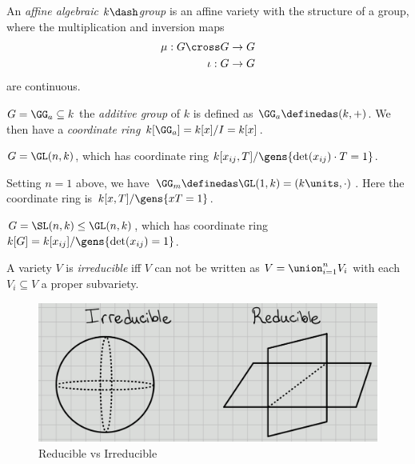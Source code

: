 \begin{definition}

An \emph{affine algebraic \(k\dash\)group} is an affine variety with the
structure of a group, where the multiplication and inversion maps
\begin{align*}  
\mu: G\cross G &\to G \\
\iota: G&\to G
\end{align*} are continuous.

\end{definition}

\begin{example}

\(G = \GG_a \subseteq k\) the \emph{additive group} of \(k\) is defined
as \(\GG_a \definedas (k, +)\). We then have a \emph{coordinate ring}
\(k[\GG_a] = k[x] / I = k[x]\).

\end{example}

\begin{example}

\(G = \GL(n, k)\), which has coordinate ring
\(k[x_{ij}, T] / \gens{\det(x_{ij})\cdot T = 1}\).

\end{example}

\begin{example}

Setting \(n=1\) above, we have
\(\GG_m \definedas \GL(1, k) = (k\units, \cdot)\). Here the coordinate
ring is \(k[x, T] / \gens{xT = 1}\).

\end{example}

\begin{example}

\(G = \SL(n, k) \leq \GL(n, k)\), which has coordinate ring
\(k[G] = k[x_{ij}] / \gens{\det(x_{ij}) = 1}\).

\end{example}

\begin{definition}[Irreducible]

A variety \(V\) is \emph{irreducible} iff \(V\) can not be written as
\(V = \union_{i=1}^n V_i\) with each \(V_i \subseteq V\) a proper
subvariety.

\begin{figure}
\centering
\includegraphics{figures/Reducible_v_irreducible.png}
\caption{Reducible vs Irreducible}
\end{figure}

\end{definition}

